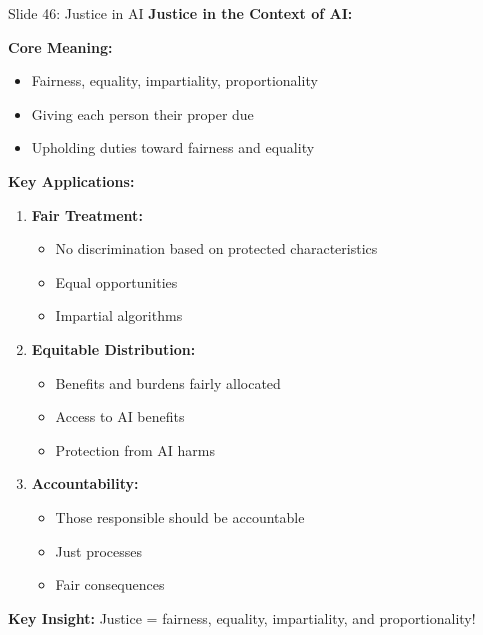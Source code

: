 \documentclass[8pt]{beamer}
\begin{document}
	\begin{frame}{Slide 46: Justice in AI}
		\fontsize{6.5}{7.5}\selectfont
		\textbf{Justice in the Context of AI:}
		
		\vspace{0.1cm}
		\textbf{Core Meaning:}
		\begin{itemize}
			\item Fairness, equality, impartiality, proportionality
			\item Giving each person their proper due
			\item Upholding duties toward fairness and equality
		\end{itemize}
		
		\vspace{0.1cm}
		\textbf{Key Applications:}
		\begin{enumerate}
			\item \textbf{Fair Treatment:}
			\begin{itemize}
				\item No discrimination based on protected characteristics
				\item Equal opportunities
				\item Impartial algorithms
			\end{itemize}
			\item \textbf{Equitable Distribution:}
			\begin{itemize}
				\item Benefits and burdens fairly allocated
				\item Access to AI benefits
				\item Protection from AI harms
			\end{itemize}
			\item \textbf{Accountability:}
			\begin{itemize}
				\item Those responsible should be accountable
				\item Just processes
				\item Fair consequences
			\end{itemize}
		\end{enumerate}
		
		\textcolor{myblue}{\textbf{Key Insight:}} Justice = \textcolor{myblue}{fairness, equality, impartiality, and proportionality}!
	\end{frame}
	
\end{document}
